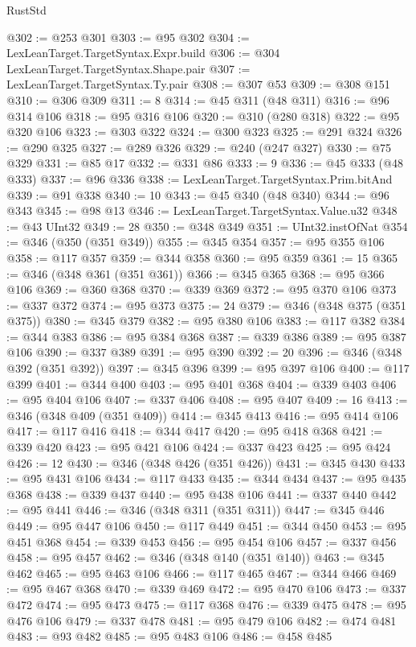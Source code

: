\begin{lexlean}{RustStd}
\begin{coremodule}
@302 := @253 @301
@303 := @95 @302
@304 := LexLeanTarget.TargetSyntax.Expr.build
@306 := @304 LexLeanTarget.TargetSyntax.Shape.pair
@307 := LexLeanTarget.TargetSyntax.Ty.pair
@308 := @307 @53
@309 := @308 @151
@310 := @306 @309
@311 := 8
@314 := @45 @311 (@48 @311)
@316 := @96 @314 @106
@318 := @95 @316 @106
@320 := @310 (@280 @318)
@322 := @95 @320 @106
@323 := @303 @322
@324 := @300 @323
@325 := @291 @324
@326 := @290 @325
@327 := @289 @326
@329 := @240 (@247 @327)
@330 := @75 @329
@331 := @85 @17
@332 := @331 @86
@333 := 9
@336 := @45 @333 (@48 @333)
@337 := @96 @336
@338 := LexLeanTarget.TargetSyntax.Prim.bitAnd
@339 := @91 @338
@340 := 10
@343 := @45 @340 (@48 @340)
@344 := @96 @343
@345 := @98 @13
@346 := LexLeanTarget.TargetSyntax.Value.u32
@348 := @43 UInt32
@349 := 28
@350 := @348 @349
@351 := UInt32.instOfNat
@354 := @346 (@350 (@351 @349))
@355 := @345 @354
@357 := @95 @355 @106
@358 := @117 @357
@359 := @344 @358
@360 := @95 @359
@361 := 15
@365 := @346 (@348 @361 (@351 @361))
@366 := @345 @365
@368 := @95 @366 @106
@369 := @360 @368
@370 := @339 @369
@372 := @95 @370 @106
@373 := @337 @372
@374 := @95 @373
@375 := 24
@379 := @346 (@348 @375 (@351 @375))
@380 := @345 @379
@382 := @95 @380 @106
@383 := @117 @382
@384 := @344 @383
@386 := @95 @384 @368
@387 := @339 @386
@389 := @95 @387 @106
@390 := @337 @389
@391 := @95 @390
@392 := 20
@396 := @346 (@348 @392 (@351 @392))
@397 := @345 @396
@399 := @95 @397 @106
@400 := @117 @399
@401 := @344 @400
@403 := @95 @401 @368
@404 := @339 @403
@406 := @95 @404 @106
@407 := @337 @406
@408 := @95 @407
@409 := 16
@413 := @346 (@348 @409 (@351 @409))
@414 := @345 @413
@416 := @95 @414 @106
@417 := @117 @416
@418 := @344 @417
@420 := @95 @418 @368
@421 := @339 @420
@423 := @95 @421 @106
@424 := @337 @423
@425 := @95 @424
@426 := 12
@430 := @346 (@348 @426 (@351 @426))
@431 := @345 @430
@433 := @95 @431 @106
@434 := @117 @433
@435 := @344 @434
@437 := @95 @435 @368
@438 := @339 @437
@440 := @95 @438 @106
@441 := @337 @440
@442 := @95 @441
@446 := @346 (@348 @311 (@351 @311))
@447 := @345 @446
@449 := @95 @447 @106
@450 := @117 @449
@451 := @344 @450
@453 := @95 @451 @368
@454 := @339 @453
@456 := @95 @454 @106
@457 := @337 @456
@458 := @95 @457
@462 := @346 (@348 @140 (@351 @140))
@463 := @345 @462
@465 := @95 @463 @106
@466 := @117 @465
@467 := @344 @466
@469 := @95 @467 @368
@470 := @339 @469
@472 := @95 @470 @106
@473 := @337 @472
@474 := @95 @473
@475 := @117 @368
@476 := @339 @475
@478 := @95 @476 @106
@479 := @337 @478
@481 := @95 @479 @106
@482 := @474 @481
@483 := @93 @482
@485 := @95 @483 @106
@486 := @458 @485

\end{coremodule}
\end{lexlean}
